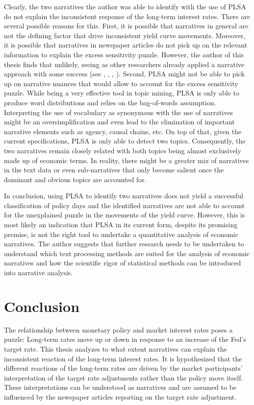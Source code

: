\documentclass[11pt,a4paper,english,oneside]{book}
\numberwithin{equation}{chapter}
\begin{document}
Clearly, the two narratives the author was able to identify with the use of PLSA do not explain the inconsistent response of the long-term interest rates. There are several possible reasons for this. First, it is possible that narratives in general are not the defining factor that drive inconsistent yield curve movements. Moreover, it is possible that narratives in newspaper articles do not pick up on the relevant information to explain the excess sensitivity puzzle. However, the author of this thesis finds that unlikely, seeing as other researchers already applied a narrative approach with some success (see \cite{Ellingsen.2003}, \cite{Cook.1989}, \cite{Goetzmann.2016}, \cite{Gurkaynak.2004}). Second, PLSA might not be able to pick up on narrative nuances that would allow to account for the excess sensitivity puzzle. While being a very effective tool in topic mining, PLSA is only able to produce word distributions and relies on the bag-of-words assumption. Interpreting the use of vocabulary as synonymous with the use of narratives might be an oversimplification and even lead to the elimination of important narrative elements such as agency, causal chains, etc. On top of that, given the current specifications, PLSA is only able to detect two topics. Consequently, the two narratives remain closely related with both topics being almost exclusively made up of economic terms. In reality, there might be a greater mix of narratives in the text data or even sub-narratives that only become salient once the dominant and obvious topics are accounted for.

In conclusion, using PLSA to identify two narratives does not yield a successful classification of policy days and the identified narratives are not able to account  for the unexplained puzzle in the movements of the yield curve. However, this is most likely an indication that PLSA in its current form, despite its promising premise, is not the right tool to undertake a quantitative analysis of economic narratives. The author suggests that further research needs to be undertaken to understand which text processing methods are suited for the analysis of economic narratives and how the scientific rigor of statistical methods can be introduced into narrative analysis. 


\chapter{Conclusion}


The relationship between monetary policy and market interest rates poses a puzzle: Long-term rates move up or down in response to an increase of the Fed's target rate. This thesis analyzes to what extent narratives can explain the inconsistent reaction of the long-term interest rates. It is hypothesized that the different reactions of the long-term rates are driven by the market participants' interpretation of the target rate adjustments rather than the policy move itself. These interpretations can be understood as narratives and are assumed to be influenced by the newspaper articles reporting on the target rate adjustment. 
\end{document}
